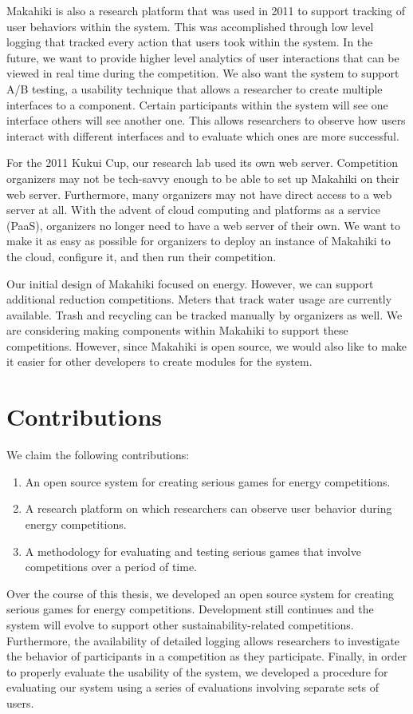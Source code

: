 Makahiki is also a research platform that was used in 2011 to support tracking of user behaviors within the system. This was accomplished through low level logging that tracked every action that users took within the system. In the future, we want to provide higher level analytics of user interactions that can be viewed in real time during the competition. We also want the system to support A/B testing, a usability technique that allows a researcher to create multiple interfaces to a component. Certain participants within the system will see one interface others will see another one. This allows researchers to observe how users interact with different interfaces and to evaluate which ones are more successful.

For the 2011 Kukui Cup, our research lab used its own web server. Competition organizers may not be tech-savvy enough to be able to set up Makahiki on their web server. Furthermore, many organizers may not have direct access to a web server at all. With the advent of cloud computing and platforms as a service (PaaS), organizers no longer need to have a web server of their own. We want to make it as easy as possible for organizers to deploy an instance of Makahiki to the cloud, configure it, and then run their competition.

Our initial design of Makahiki focused on energy. However, we can support additional reduction competitions. Meters that track water usage are currently available. Trash and recycling can be tracked manually by organizers as well. We are considering making components within Makahiki to support these competitions. However, since Makahiki is open source, we would also like to make it easier for other developers to create modules for the system.

\section{Contributions}
\label{contributions}

We claim the following contributions:

\begin{enumerate}
  \item An open source system for creating serious games for energy competitions.
  \item A research platform on which researchers can observe user behavior during energy competitions.
	\item A methodology for evaluating and testing serious games that involve competitions over a period of time.
\end{enumerate}

Over the course of this thesis, we developed an open source system for creating serious games for energy competitions. Development still continues and the system will evolve to support other sustainability-related competitions. Furthermore, the availability of detailed logging allows researchers to investigate the behavior of participants in a competition as they participate. Finally, in order to properly evaluate the usability of the system, we developed a procedure for evaluating our system using a series of evaluations involving separate sets of users.

